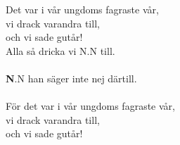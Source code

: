 \vspace{10pt}
Det var i vår ungdoms fagraste vår,\\
vi drack varandra till,\\
och vi sade gutår!\\
Alla så dricka vi N.N till.\\
\\
{\textbf N.N han säger inte nej därtill.}\\
\\
För det var i vår ungdoms fagraste vår,\\
vi drack varandra till,\\
och vi sade gutår! 
